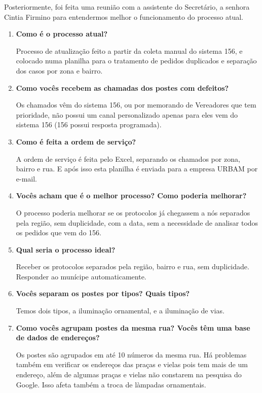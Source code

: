 \documentclass[
	article,			%
	11pt,				%
	oneside,			%
	a4paper,			%
	english,			%
	brazil,				%
	sumario=tradicional
	]{abntex2}
\begin{document}
Posteriormente, foi feita uma reunião com a assistente do Secretário, a senhora Cintia Firmino para entendermos melhor o funcionamento do processo atual.
\begin{enumerate}

\item \textbf{Como é o processo atual?}

Processo de atualização feito a partir da coleta manual do sistema 156, e colocado numa planilha para o tratamento de pedidos duplicados e separação dos casos por zona e bairro.

\item \textbf{Como vocês recebem as chamadas dos postes com defeitos?}

Os chamados vêm do sistema 156, ou por memorando de Vereadores que tem prioridade, não possui um canal personalizado apenas para eles vem do sistema 156 (156 possui resposta programada).

\item \textbf{Como é feita a ordem de serviço?}

A ordem de serviço é feita pelo Excel, separando os chamados por zona, bairro e rua. E após isso esta planilha é enviada para a empresa URBAM por e-mail.

\item \textbf{Vocês acham que é o melhor processo? Como poderia melhorar?}

O processo poderia melhorar se os protocolos já chegassem a nós separados pela região, sem duplicidade, com a data, sem a necessidade de analisar todos os pedidos que vem do 156.

\item \textbf{Qual seria o processo ideal?}

Receber os protocolos separados pela região, bairro e rua, sem duplicidade. Responder ao munícipe automaticamente.

\item \textbf{Vocês separam os postes por tipos? Quais tipos?}

Temos dois tipos, a iluminação ornamental, e a iluminação de vias.

\item \textbf{Como vocês agrupam postes da mesma rua? Vocês têm uma base de dados de endereços?}

Os postes são agrupados em até 10 números da mesma rua. Há problemas também em verificar os endereços das praças e vielas pois tem mais de um endereço, além de algumas praças e vielas não constarem na pesquisa do Google.
Isso afeta também a troca de làmpadas ornamentais.


\end{enumerate}
\end{document}

